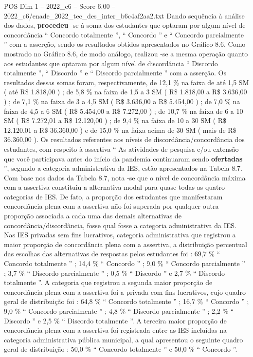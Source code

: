 \begin{textsample}{POS Dim 1 – 2022\_c6 – Score 6.00 – 2022\_c6/enade\_2022\_tec\_des\_inter\_b6c4af2aa2.txt}
Dando sequência à análise dos dados, \textbf{procedeu} -se à soma dos estudantes que optaram por algum nível de concordância “ Concordo totalmente ”, “ Concordo ” e “ Concordo parcialmente ” com a asserção, sendo os resultados obtidos apresentados no Gráfico 8.6.
Como mostrado no Gráfico 8.6, de modo análogo, realizou -se a mesma operação quanto aos estudantes que optaram por algum nível de discordância “ Discordo totalmente ”, “ Discordo ” e “ Discordo parcialmente ” com a asserção.
Os resultados dessas somas foram, respectivamente, de 12,1 \% na faixa de até 1,5 SM ( até R\$ 1.818,00 ) ; de 5,8 \% na faixa de 1,5 a 3 SM ( R\$ 1.818,00 a R\$ 3.636,00 ) ; de 7,1 \% na faixa de 3 a 4,5 SM ( R\$ 3.636,00 a R\$ 5.454,00 ) ; de 7,0 \% na faixa de 4,5 a 6 SM ( R\$ 5.454,00 a R\$ 7.272,00 ) ; de 10,7 \% na faixa de 6 a 10 SM ( R\$ 7.272,01 a R\$ 12.120,00 ) ; de 9,4 \% na faixa de 10 a 30 SM ( R\$ 12.120,01 a R\$ 36.360,00 ) e de 15,0 \% na faixa acima de 30 SM ( mais de R\$ 36.360,00 ).
Os resultados referentes aos níveis de discordância/concordância dos estudantes, com respeito à assertiva “ As atividades de pesquisa e/ou extensão que você participava antes do início da pandemia continuaram sendo \textbf{ofertadas} ”, segundo a categoria administrativa da IES, estão apresentados na Tabela 8.7.
Com base nos dados da Tabela 8.7, nota -se que o nível de concordância máxima com a assertiva constituiu a alternativa modal para quase todas as quatro categorias de IES.
De fato, a proporção dos estudantes que manifestaram concordância plena com a assertiva não foi superada por qualquer outra proporção associada a cada uma das demais alternativas de concordância/discordância, fosse qual fosse a categoria administrativa da IES.
Nas IES privadas sem fins lucrativos, categoria administrativa que registrou a maior proporção de concordância plena com a assertiva, a distribuição percentual das escolhas das alternativas de respostas pelos estudantes foi : 69,7 \% “ Concordo totalmente ” ; 14,4 \% “ Concordo ” ; 9,0 \% “ Concordo parcialmente ” ; 3,7 \% “ Discordo parcialmente ” ; 0,5 \% “ Discordo ” e 2,7 \% “ Discordo totalmente ”.
A categoria que registrou a segunda maior proporção de concordância plena com a assertiva foi a privada com fins lucrativos, cujo quadro geral de distribuição foi : 64,8 \% “ Concordo totalmente ” ; 16,7 \% “ Concordo ” ; 9,0 \% “ Concordo parcialmente ” ; 4,8 \% “ Discordo parcialmente ” ; 2,2 \% “ Discordo ” e 2,5 \% “ Discordo totalmente ”.
A terceira maior proporção de concordância plena com a assertiva foi registrada entre as IES incluídas na categoria administrativa pública municipal, a qual apresentou o seguinte quadro geral de distribuição : 50,0 \% “ Concordo totalmente ” e 50,0 \% “ Concordo ”.

\end{textsample}
